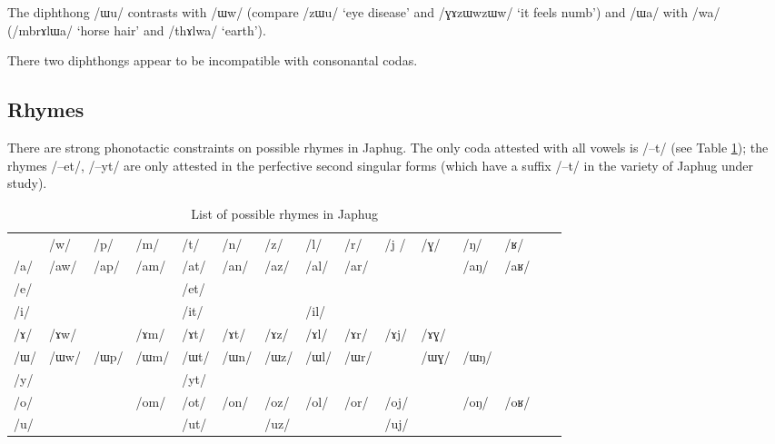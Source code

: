 \documentclass[oldfontcommands,oneside,a4paper,11pt]{article}
\newcommand{\ipa}[1]{/#1/} %
\begin{document}
          The diphthong \ipa{ɯu} contrasts with \ipa{ɯw} (compare \ipa{zɯu}  `eye disease' and \ipa{ɣɤzɯwzɯw} `it feels numb') and \ipa{ɯa} with \ipa{wa} (\ipa{mbrɤlɯa} `horse hair' and \ipa{thɤlwa} `earth').
          
          
There two diphthongs appear to be incompatible with consonantal codas.
     
\subsection{Rhymes}     \label{sec:rhymes}
     There are strong phonotactic constraints on possible rhymes in Japhug. The only coda attested with all  vowels is \ipa{--t} (see Table \ref{tab:rhymes}); the rhymes \ipa{--et}, \ipa{--yt} are only attested in the perfective second singular forms (which have a suffix \ipa{--t} in the variety of Japhug under study).
    
   \begin{table}
 \caption{List of possible rhymes in Japhug} \label{tab:rhymes}  \centering
\begin{tabular}{lllllllllllllll}
\toprule 
 &	\ipa{w} &	\ipa{p} &	\ipa{m} &	\ipa{t} &	\ipa{n} &	\ipa{z} &	\ipa{l} &	\ipa{r} &	\ipa{j } &	\ipa{ɣ} &	\ipa{ŋ} &	\ipa{ʁ} \\
\ipa{a} &	\ipa{aw} &	\ipa{ap} &	\ipa{am} &	\ipa{at} &	\ipa{an} &	\ipa{az} &	\ipa{al} &	\ipa{ar} &	 &	 &	\ipa{aŋ} &	\ipa{aʁ} \\
\ipa{e} &	 &	 &	 &	\ipa{et} &	 &	 &	 &	 &	 &	 &	 &	 \\
\ipa{i} &	 &	 &	 &	\ipa{it} &	 &	 &	\ipa{il} &	 &	 &	 &	 &	 \\
\ipa{ɤ} &	\ipa{ɤw} &	 &	\ipa{ɤm} &	\ipa{ɤt} &	\ipa{ɤt} &	\ipa{ɤz} &	\ipa{ɤl} &	\ipa{ɤr} &	\ipa{ɤj} &	\ipa{ɤɣ} &	 &	 \\
\ipa{ɯ} &	\ipa{ɯw} &	\ipa{ɯp} &	\ipa{ɯm} &	\ipa{ɯt} &	\ipa{ɯn} &	\ipa{ɯz} &	\ipa{ɯl} &	\ipa{ɯr} &	 &	\ipa{ɯɣ} &	\ipa{ɯŋ} &	 \\
\ipa{y} &	 &	 &	 &	\ipa{yt} &	 &	 &	 &	 &	 &	 &	 &	 \\
\ipa{o} &	 &	 &	\ipa{om} &	\ipa{ot} &	\ipa{on} &	\ipa{oz} &	\ipa{ol} &	\ipa{or} &	\ipa{oj} &	 &	\ipa{oŋ} &	\ipa{oʁ} \\
\ipa{u} &	 &	 &	 &	\ipa{ut} &	 &	\ipa{uz} &	 &	 &	\ipa{uj} &	 &	 &	 \\
\bottomrule
\end{tabular}
\end{table}
\end{document}
